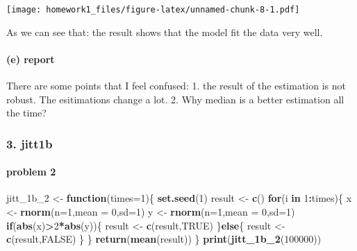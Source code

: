 \documentclass[]{article}
\newenvironment{Shaded}{\begin{snugshade}}{\end{snugshade}}
\newcommand{\KeywordTok}[1]{\textcolor[rgb]{0.13,0.29,0.53}{\textbf{#1}}}
\newcommand{\DataTypeTok}[1]{\textcolor[rgb]{0.13,0.29,0.53}{#1}}
\newcommand{\DecValTok}[1]{\textcolor[rgb]{0.00,0.00,0.81}{#1}}
\newcommand{\StringTok}[1]{\textcolor[rgb]{0.31,0.60,0.02}{#1}}
\newcommand{\OtherTok}[1]{\textcolor[rgb]{0.56,0.35,0.01}{#1}}
\newcommand{\ControlFlowTok}[1]{\textcolor[rgb]{0.13,0.29,0.53}{\textbf{#1}}}
\newcommand{\OperatorTok}[1]{\textcolor[rgb]{0.81,0.36,0.00}{\textbf{#1}}}
\newcommand{\NormalTok}[1]{#1}
\let\oldparagraph\paragraph
\renewcommand{\paragraph}[1]{\oldparagraph{#1}\mbox{}}
\begin{document}
\texttt{[image: homework1\_files/figure-latex/unnamed-chunk-8-1.pdf]}

As we can see that: the result shows that the model fit the data very
well.

\paragraph{(e) report}\label{e-report}

There are some points that I feel confused: 1. the result of the
estimation is not robust. The esitimations change a lot. 2. Why median
is a better estimation all the time?

\subsubsection{3. jitt1b}\label{jitt1b}

\paragraph{problem 2}\label{problem-2}

\begin{Shaded}
\begin{Highlighting}[]
\NormalTok{jitt_1b_}\DecValTok{2}\NormalTok{ <-}\StringTok{ }\ControlFlowTok{function}\NormalTok{(}\DataTypeTok{times=}\DecValTok{1}\NormalTok{)\{}
        \KeywordTok{set.seed}\NormalTok{(}\DecValTok{1}\NormalTok{)}
\NormalTok{        result <-}\StringTok{ }\KeywordTok{c}\NormalTok{()}
        \ControlFlowTok{for}\NormalTok{(i }\ControlFlowTok{in} \DecValTok{1}\OperatorTok{:}\NormalTok{times)\{}
\NormalTok{          x <-}\StringTok{ }\KeywordTok{rnorm}\NormalTok{(}\DataTypeTok{n=}\DecValTok{1}\NormalTok{,}\DataTypeTok{mean =} \DecValTok{0}\NormalTok{,}\DataTypeTok{sd=}\DecValTok{1}\NormalTok{)}
\NormalTok{          y <-}\StringTok{ }\KeywordTok{rnorm}\NormalTok{(}\DataTypeTok{n=}\DecValTok{1}\NormalTok{,}\DataTypeTok{mean =} \DecValTok{0}\NormalTok{,}\DataTypeTok{sd=}\DecValTok{1}\NormalTok{)}
          \ControlFlowTok{if}\NormalTok{(}\KeywordTok{abs}\NormalTok{(x)}\OperatorTok{>}\DecValTok{2}\OperatorTok{*}\KeywordTok{abs}\NormalTok{(y))\{}
\NormalTok{                  result <-}\StringTok{ }\KeywordTok{c}\NormalTok{(result,}\OtherTok{TRUE}\NormalTok{)}
\NormalTok{          \}}\ControlFlowTok{else}\NormalTok{\{}
\NormalTok{                  result <-}\StringTok{ }\KeywordTok{c}\NormalTok{(result,}\OtherTok{FALSE}\NormalTok{)}
\NormalTok{          \}}
\NormalTok{        \}}
        \KeywordTok{return}\NormalTok{(}\KeywordTok{mean}\NormalTok{(result))}
\NormalTok{\}}
\KeywordTok{print}\NormalTok{(}\KeywordTok{jitt_1b_2}\NormalTok{(}\DecValTok{100000}\NormalTok{))}
\end{Highlighting}
\end{Shaded}
\end{document}
